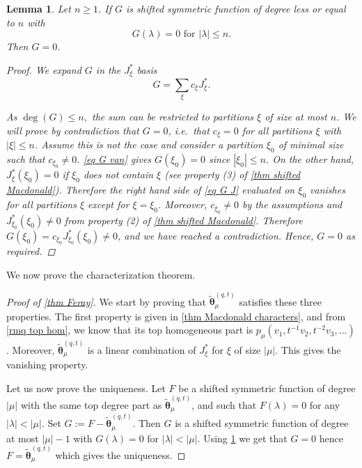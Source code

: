 \documentclass[12pt]{amsart}
\newtheorem{lem}[thm]{Lemma}
\theoremstyle{remark}
\newcommand{\Mch}{\boldsymbol{\widetilde\theta}^{(q,t)}}
\begin{document}
\begin{lem}\label{lem uniqueness}
    Let $n\geq1$. If $G$ is shifted symmetric function of degree less or equal to $n$ with
      \begin{equation}\label{eq G van}
    G(\lambda)=0 \text{ for $|\lambda|\leq n$}. 
\end{equation}
Then $G=0$. 
    \begin{proof}
We expand $G$ in the $J^*_\xi$ basis 
\begin{equation}\label{eq G J}
  G=\sum_\xi c_\xi J^*_\xi.  
\end{equation}

As $\deg(G)\leq n,$ the sum can be restricted to partitions $\xi$ of size at most $n$. 
We will prove by contradiction that $G=0$, i.e.\ that $c_\xi=0$
for all partitions $\xi$ with $|\xi|\leq n$. Assume this is not
the case and consider a partition $\xi_0$ of minimal size such that
$c_{\xi_0}\neq 0$.
\cref{eq G van} gives $G(\xi_0)=0$ since $|\xi_0|\leq n$. On the other
hand, $J_\xi^*(\xi_0)=0$ if $\xi_0$ does not contain $\xi$ (see
property (3) of \cref{thm shifted Macdonald}). Therefore the right hand side of \cref{eq G J} evaluated on
$\xi_0$ vanishes for
all partitions $\xi$ except for $\xi=\xi_0$. Moreover,
$c_{\xi_0}\neq 0$ by the assumptions and
$J^*_{\xi_0}(\xi_0)\neq0$ from property (2) of \cref{thm shifted Macdonald}. Therefore
$G(\xi_0) = c_{\xi_0} J^{*}_{\xi_0}(\xi_0) \neq 0$, and we have reached a contradiction. Hence, $G=0$ as required.    \end{proof}
\end{lem}

We now prove the characterization theorem.
\begin{proof}[Proof of \cref{thm Feray}]
    We start by proving that $\Mch_\mu$ satisfies these three properties. The first property is given in \cref{thm Macdonald characters}, and from \cref{rmq top hom}, we know that its top homogeneous part is $p_\mu(v_1,t^{-1}v_2,t^{-2}v_3,\dots)$. Moreover, $\Mch_\mu$ is a linear combination of $J_\xi^{*}$ for $\xi$ of size $|\mu|$. This gives the vanishing property.

    Let us now prove the uniqueness. Let $F$ be a shifted symmetric function of degree $|\mu|$ with the same top degree part as $\Mch_\mu$, and such that $F(\lambda)=0$ for any $|\lambda |<|\mu|$. Set $G:=F-\Mch_\mu$. Then $G$ is a shifted symmetric function of degree at most $|\mu|-1$ with 
$G(\lambda)=0 \text{ for $|\lambda|<|\mu|$}.$ Using \cref{lem uniqueness} we get that $G=0$ hence $F=\Mch_\mu$ which gives the uniqueness.
 \end{proof}
\end{document}
